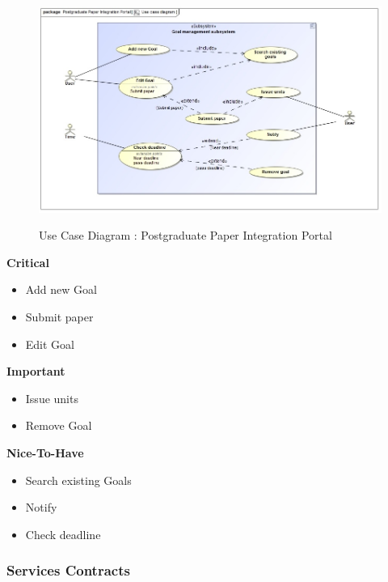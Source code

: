 \documentclass{article}
\begin{document}
		\begin{figure}[H]
			\includegraphics[width=\textwidth]{Ruan_Diagrams/useCaseDiagram.jpg}  \\
			\caption{Use Case Diagram : Postgraduate Paper Integration Portal}
		\end{figure}
		\begin{flushleft}
			\textbf{Critical}
				\begin{itemize}
	  				\item Add new Goal
	 	 			\item Submit paper
	  				\item Edit Goal
				\end{itemize}

			\textbf{Important}
				\begin{itemize}
	  				\item Issue units
	  				\item Remove Goal
				\end{itemize}

			\textbf{Nice-To-Have}
				\begin{itemize}
	  				\item Search existing Goals
	  				\item Notify
	  				\item Check deadline
				\end{itemize}
		\end{flushleft}

	\subsubsection{Services Contracts}
\end{document}
